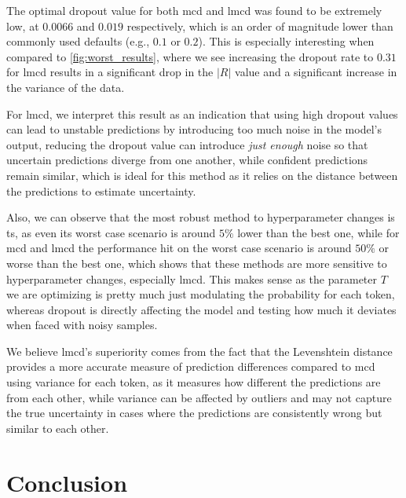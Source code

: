 \documentclass[11pt]{article}
\begin{document}
The optimal dropout value for both \acrshort{mcd} and \acrshort{lmcd} was found to be extremely low, at $0.0066$ and $0.019$  respectively, which is an order of magnitude lower than commonly used defaults (e.g., $0.1$ or $0.2$). This is especially interesting when compared to \ref{fig:worst_results}, where we see increasing the dropout rate to $0.31$ for \acrshort{lmcd} results in a significant drop in the $|R|$ value and a significant increase in the variance of the data.

For \acrshort{lmcd}, we interpret this result as an indication that using high dropout values can lead to unstable predictions by introducing too much noise in the model's output, reducing the dropout value can introduce \textit{just enough} noise so that uncertain predictions diverge from one another, while confident predictions remain similar, which is ideal for this method as it relies on the distance between the predictions to estimate uncertainty. 

Also, we can observe that the most robust method to hyperparameter changes is \acrshort{ts}, as even its worst case scenario is around $5\%$ lower than the best one, while for \acrshort{mcd} and \acrshort{lmcd} the performance hit on the worst case scenario is around $50\%$ or worse than the best one, which shows that these methods are more sensitive to hyperparameter changes, especially \acrshort{lmcd}. This makes sense as the parameter $T$ we are optimizing is pretty much just modulating the probability for each token, whereas dropout is directly affecting the model and testing how much it deviates when faced with noisy samples.

We believe \acrshort{lmcd}'s superiority comes from the fact that the Levenshtein distance\cite{levenshtein1966binary} provides a more accurate measure of prediction differences compared to \acrshort{mcd} using variance for each token, as it measures how different the predictions are from each other, while variance can be affected by outliers and may not capture the true uncertainty in cases where the predictions are consistently wrong but similar to each other.




\section{Conclusion}
\end{document}
